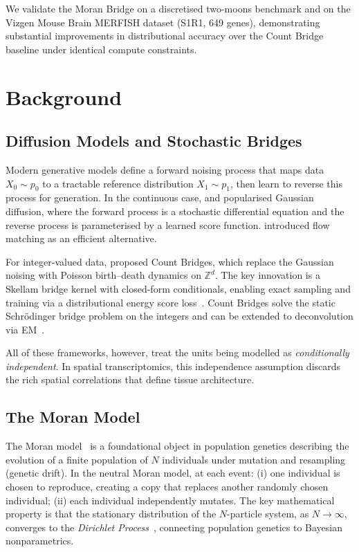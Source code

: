 \documentclass[11pt]{article}
\begin{document}
We validate the Moran Bridge on a discretised two-moons benchmark and on the Vizgen Mouse Brain MERFISH dataset (S1R1, 649 genes), demonstrating substantial improvements in distributional accuracy over the Count Bridge baseline under identical compute constraints.

\section{Background}
\label{sec:background}

\subsection{Diffusion Models and Stochastic Bridges}

Modern generative models define a forward noising process that maps data $X_0 \sim p_0$ to a tractable reference distribution $X_1 \sim p_1$, then learn to reverse this process for generation. In the continuous case, \citet{ho2020denoising} and \citet{song2020score} popularised Gaussian diffusion, where the forward process is a stochastic differential equation and the reverse process is parameterised by a learned score function. \citet{lipman2022flow} introduced flow matching as an efficient alternative.

For integer-valued data, \citet{fishman2025count} proposed Count Bridges, which replace the Gaussian noising with Poisson birth--death dynamics on $\mathbb{Z}^d$. The key innovation is a Skellam bridge kernel with closed-form conditionals, enabling exact sampling and training via a distributional energy score loss~\citep{gneiting2007scoring, debortoli2025distributional}. Count Bridges solve the static Schr\"{o}dinger bridge problem on the integers and can be extended to deconvolution via EM~\citep{rozet2024em}.

All of these frameworks, however, treat the units being modelled as \emph{conditionally independent}. In spatial transcriptomics, this independence assumption discards the rich spatial correlations that define tissue architecture.

\subsection{The Moran Model}

The Moran model~\citep{moran1958random} is a foundational object in population genetics describing the evolution of a finite population of $N$ individuals under mutation and resampling (genetic drift). In the neutral Moran model, at each event: (i) one individual is chosen to reproduce, creating a copy that replaces another randomly chosen individual; (ii) each individual independently mutates. The key mathematical property is that the stationary distribution of the $N$-particle system, as $N \to \infty$, converges to the \emph{Dirichlet Process}~\citep{kingman1982coalescent, ewens2004mathematical}, connecting population genetics to Bayesian nonparametrics.
\end{document}
